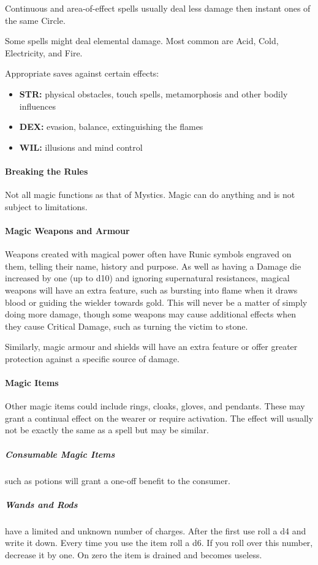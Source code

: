 \documentclass[itdr]{subfiles}
\begin{document}
Continuous and area-of-effect spells usually deal less damage then instant ones of the same Circle.

Some spells might deal elemental damage. Most common are Acid, Cold, Electricity, and Fire.

Appropriate saves against certain effects:
\begin{itemize}
	\item \textbf{STR:} physical obstacles, touch spells, metamorphosis and other bodily influences
	\item \textbf{DEX:} evasion, balance, extinguishing the flames
	\item \textbf{WIL:} illusions and mind control
\end{itemize}

\vfill
\break

\paragraph{Breaking the Rules}
Not all magic functions as that of Mystics. Magic can do anything and is not subject to limitations.

\paragraph{Magic Weapons and Armour}
Weapons created with magical power often have Runic symbols engraved on them, telling their name, history and purpose. As well as having a Damage die increased by one (up to d10) and ignoring supernatural resistances, magical weapons will have an extra feature, such as bursting into flame when it draws blood or guiding the wielder towards gold. This will never be a matter of simply doing more damage, though some weapons may cause additional effects when they cause Critical Damage, such as turning the victim to stone.

Similarly, magic armour and shields will have an extra feature or offer greater protection against a specific source of damage.

\paragraph{Magic Items}
Other magic items could include rings, cloaks, gloves, and pendants. These may grant a continual effect on the wearer or require activation. The effect will usually not be exactly the same as a spell but may be similar.

\subparagraph{Consumable Magic Items} such as potions will grant a one-off benefit to the consumer.

\subparagraph{Wands and Rods} have a limited and unknown number of charges. After the first use roll a d4 and write it down. Every time you use the item roll a d6. If you roll over this number, decrease it by one. On zero the item is drained and becomes useless.

\end{document}
